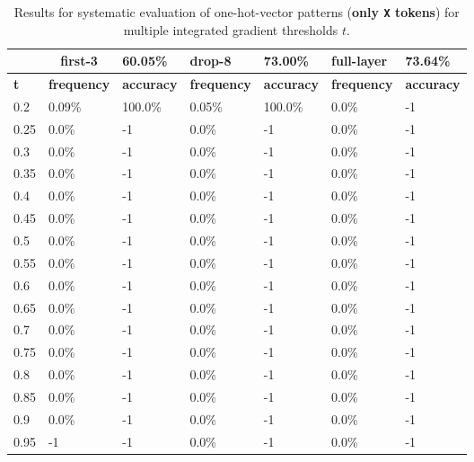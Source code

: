 
\begin{table}[t]
\centering
\begin{tabular}{lllllll}
\hline
\multicolumn{1}{c}{} & \multicolumn{1}{c}{first-3} & \multicolumn{1}{l|}{60.05\%} & drop-8 & \multicolumn{1}{l|}{73.00\%} & full-layer & 73.64\% \\ \hline
\multicolumn{1}{l|}{\textbf{t}} & \textbf{frequency} & \multicolumn{1}{l|}{\textbf{accuracy}} & \textbf{frequency} & \multicolumn{1}{l|}{\textbf{accuracy}} & \textbf{frequency} & \textbf{accuracy} \\ \hline	\multicolumn{1}{l|}{0.2}&  0.09\% & \multicolumn{1}{l|}{100.0\%}& 0.05\% & \multicolumn{1}{l|}{100.0\%}& 0.0\% & -1\\ 
\multicolumn{1}{l|}{0.25}&  0.0\% & \multicolumn{1}{l|}{-1}& 0.0\% & \multicolumn{1}{l|}{-1}& 0.0\% & -1\\ 
\multicolumn{1}{l|}{0.3}&  0.0\% & \multicolumn{1}{l|}{-1}& 0.0\% & \multicolumn{1}{l|}{-1}& 0.0\% & -1\\ 
\multicolumn{1}{l|}{0.35}&  0.0\% & \multicolumn{1}{l|}{-1}& 0.0\% & \multicolumn{1}{l|}{-1}& 0.0\% & -1\\ 
\multicolumn{1}{l|}{0.4}&  0.0\% & \multicolumn{1}{l|}{-1}& 0.0\% & \multicolumn{1}{l|}{-1}& 0.0\% & -1\\ 
\multicolumn{1}{l|}{0.45}&  0.0\% & \multicolumn{1}{l|}{-1}& 0.0\% & \multicolumn{1}{l|}{-1}& 0.0\% & -1\\ 
\multicolumn{1}{l|}{0.5}&  0.0\% & \multicolumn{1}{l|}{-1}& 0.0\% & \multicolumn{1}{l|}{-1}& 0.0\% & -1\\ 
\multicolumn{1}{l|}{0.55}&  0.0\% & \multicolumn{1}{l|}{-1}& 0.0\% & \multicolumn{1}{l|}{-1}& 0.0\% & -1\\ 
\multicolumn{1}{l|}{0.6}&  0.0\% & \multicolumn{1}{l|}{-1}& 0.0\% & \multicolumn{1}{l|}{-1}& 0.0\% & -1\\ 
\multicolumn{1}{l|}{0.65}&  0.0\% & \multicolumn{1}{l|}{-1}& 0.0\% & \multicolumn{1}{l|}{-1}& 0.0\% & -1\\ 
\multicolumn{1}{l|}{0.7}&  0.0\% & \multicolumn{1}{l|}{-1}& 0.0\% & \multicolumn{1}{l|}{-1}& 0.0\% & -1\\ 
\multicolumn{1}{l|}{0.75}&  0.0\% & \multicolumn{1}{l|}{-1}& 0.0\% & \multicolumn{1}{l|}{-1}& 0.0\% & -1\\ 
\multicolumn{1}{l|}{0.8}&  0.0\% & \multicolumn{1}{l|}{-1}& 0.0\% & \multicolumn{1}{l|}{-1}& 0.0\% & -1\\ 
\multicolumn{1}{l|}{0.85}&  0.0\% & \multicolumn{1}{l|}{-1}& 0.0\% & \multicolumn{1}{l|}{-1}& 0.0\% & -1\\ 
\multicolumn{1}{l|}{0.9}&  0.0\% & \multicolumn{1}{l|}{-1}& 0.0\% & \multicolumn{1}{l|}{-1}& 0.0\% & -1\\ 
\multicolumn{1}{l|}{0.95}&  -1 & \multicolumn{1}{l|}{-1}& 0.0\% & \multicolumn{1}{l|}{-1}& 0.0\% & -1\\ 


\hline
\end{tabular}
\caption[Model Evaluation for only \texttt{X} tokens]{Results for systematic evaluation of one-hot-vector patterns (\textbf{only \texttt{X} tokens}) for multiple integrated gradient thresholds $t$.}
\label{tab:evalResultsX}
\end{table}
	